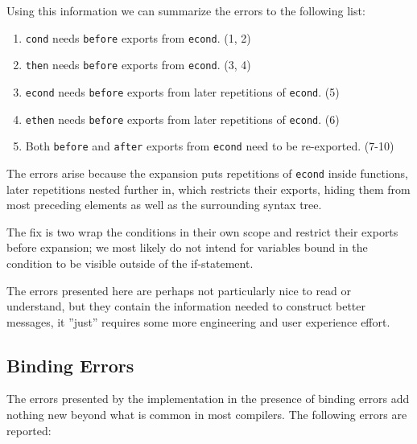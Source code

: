 \documentclass{kththesis}
\begin{document}
Using this information we can summarize the errors to the following list:

\begin{enumerate}
  \item \texttt{cond} needs \texttt{before} exports from \texttt{econd}. (1, 2)
  \item \texttt{then} needs \texttt{before} exports from \texttt{econd}. (3, 4)
  \item \texttt{econd} needs \texttt{before} exports from later repetitions of \texttt{econd}. (5)
  \item \texttt{ethen} needs \texttt{before} exports from later repetitions of \texttt{econd}. (6)
  \item Both \texttt{before} and \texttt{after} exports from \texttt{econd} need to be re-exported. (7-10)
\end{enumerate}

The errors arise because the expansion puts repetitions of \texttt{econd} inside functions, later repetitions nested further in, which restricts their exports, hiding them from most preceding elements as well as the surrounding syntax tree.

The fix is two wrap the conditions in their own scope and restrict their exports before expansion; we most likely do not intend for variables bound in the condition to be visible outside of the if-statement.

The errors presented here are perhaps not particularly nice to read or understand, but they contain the information needed to construct better messages, it ''just'' requires some more engineering and user experience effort.

\subsection{Binding Errors}

The errors presented by the implementation in the presence of binding errors add nothing new beyond what is common in most compilers. The following errors are reported:
\end{document}
